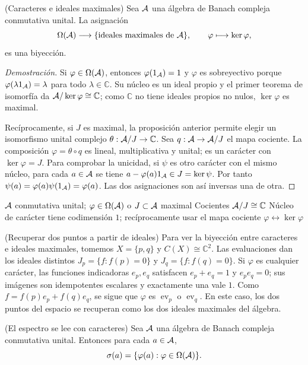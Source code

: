 \pagebreak
\begin{cthproposicion}{(Caracteres e ideales maximales)}
Sea $\mathcal A$ una álgebra de Banach compleja conmutativa unital.
La asignación
\[
 \Omega(\mathcal A)\longrightarrow\{\text{ideales maximales de }\mathcal A\},\qquad
 \varphi\longmapsto\ker\varphi,
\]
es una biyección.
\end{cthproposicion}

\begin{proof}[Demostración]
Si $\varphi\in\Omega(\mathcal A)$, entonces $\varphi(1_\mathcal A)=1$ y
$\varphi$ es sobreyectivo porque $\varphi(\lambda1_\mathcal A)=\lambda$
para todo $\lambda\in\mathbb C$. Su núcleo es un ideal propio y el
primer teorema de isomorfía da
$\mathcal A/\ker\varphi\cong\mathbb C$; como $\mathbb C$ no tiene
ideales propios no nulos, $\ker\varphi$ es maximal.

Recíprocamente, si $J$ es maximal, la proposición anterior permite
elegir un isomorfismo unital complejo
$\theta:\mathcal A/J\to\mathbb C$. Sea
$q:\mathcal A\to\mathcal A/J$ el mapa cociente. La composición
$\varphi=\theta\circ q$ es lineal, multiplicativa y unital;
es un carácter con $\ker\varphi=J$.
Para comprobar la unicidad, si $\psi$ es otro carácter con el mismo
núcleo, para cada $a\in\mathcal A$ se tiene
$a-\varphi(a)1_\mathcal A\in J=\ker\psi$. Por tanto
$\psi(a)=\varphi(a)\psi(1_\mathcal A)=\varphi(a)$. Las dos asignaciones
son así inversas una de otra.
\end{proof}

\proofdiagram
{$\mathcal A$ conmutativa unital; $\varphi\in\Omega(\mathcal A)$ o $J\subset\mathcal A$ maximal}
{Cocientes $\mathcal A/J\cong\mathbb C$}
{Núcleo de carácter tiene codimensión $1$; recíprocamente usar el mapa cociente}
{$\varphi\leftrightarrow\ker\varphi$}

\begin{cthejemplo}{(Recuperar dos puntos a partir de ideales)}
Para ver la biyección entre caracteres e ideales maximales,
tomemos $X=\{p,q\}$ y $C(X)\cong\mathbb C^2$.
Las evaluaciones dan los ideales distintos
$J_p=\{f:f(p)=0\}$ y $J_q=\{f:f(q)=0\}$.
Si $\varphi$ es cualquier carácter, las funciones indicadoras
$e_p,e_q$ satisfacen $e_p+e_q=1$ y $e_pe_q=0$;
sus imágenes son idempotentes escalares y exactamente una vale $1$.
Como $f=f(p)e_p+f(q)e_q$, se sigue que $\varphi$ es
$\operatorname{ev}_p$ o $\operatorname{ev}_q$.
En este caso, los dos puntos del espacio se recuperan como los
dos ideales maximales del álgebra.
\end{cthejemplo}

\begin{cthteorema}{(El espectro se lee con caracteres)}
Sea $\mathcal A$ una álgebra de Banach compleja conmutativa unital.
Entonces para cada $a\in\mathcal A$,
\[
 \sigma(a)=\{\varphi(a):\varphi\in\Omega(\mathcal A)\}.
\]
\end{cthteorema}

